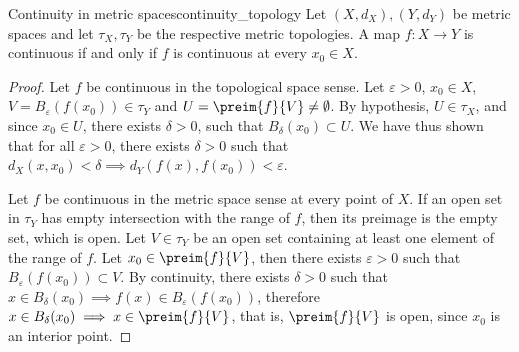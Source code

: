 \begin{theorem}{Continuity in metric spaces}{continuity_topology}
    Let \((X, d_X), (Y, d_Y)\) be metric spaces and let \(\tau_X,\tau_Y\) be the respective metric topologies. A map \(f : X \to Y\) is continuous if and only if \(f\) is continuous at every \(x_0 \in X\).
\end{theorem}
\begin{proof}
    Let \(f\) be continuous in the topological space sense. Let \(\varepsilon > 0\), \(x_0 \in X\), \(V = B_{\varepsilon}(f(x_0)) \in \tau_Y\) and \(U = \preim{f}{V} \neq \emptyset\). By hypothesis, \(U \in \tau_X\), and since \(x_0 \in U\), there exists \(\delta > 0\), such that \(B_\delta(x_0) \subset U\). We have thus shown that for all \(\varepsilon > 0\), there exists \(\delta > 0\) such that \(d_X(x,x_0) < \delta \implies d_Y(f(x), f(x_0)) < \varepsilon\).

    Let \(f\) be continuous in the metric space sense at every point of \(X\). If an open set in \(\tau_Y\) has empty intersection with the range of \(f\), then its preimage is the empty set, which is open. Let \(V \in \tau_Y\) be an open set containing at least one element of the range of \(f\). Let \(x_0 \in \preim{f}{V}\), then there exists \(\varepsilon > 0\) such that \(B_{\varepsilon}(f(x_0)) \subset V\). By continuity, there exists \(\delta > 0\) such that \(x \in B_\delta(x_0) \implies f(x) \in B_\varepsilon(f(x_0))\), therefore \(x \in B_\delta(x_0) \implies x \in \preim{f}{V}\), that is, \(\preim{f}{V}\) is open, since \(x_0\) is an interior point.
\end{proof}

